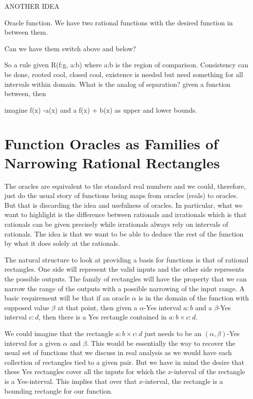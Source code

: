 \documentclass[12pt]{article}
\theoremstyle{remark}
\begin{document}
ANOTHER IDEA

Oracle function.  We have two rational functions with the desired function in between them. 

Can we have them switch above and below? 

So a rule given R(f:g, a:b) where a:b is the region of comparison. Consistency can be done, rooted cool, closed cool, existence is needed but need something for all intervals within domain. What is the analog of separation? given a function between, then

imagine f(x) -a(x) and a f(x) + b(x) as upper and lower bounds. 


\section{Function Oracles as Families of Narrowing Rational Rectangles}

The oracles are equivalent to the standard real numbers and we could, therefore, just do the usual story of functions being maps from oracles (reals) to oracles. But that is discarding the idea and usefulness of oracles. In particular, what we want to highlight is the difference between rationals and irrationals which is that rationals can be given precisely while irrationals always rely on intervals of rationals. The idea is that we want to be able to deduce the rest of the function by what it does solely at the rationals. 

The natural structure to look at providing a basis for functions is that of rational rectangles. One side will represent the valid inputs and the other side represents the possible outputs. The family of rectangles will have the property that we can narrow the range of the outputs with a possible narrowing of the input range. A basic requirement will be that if an oracle $\alpha$ is in the domain of the function with supposed value $\beta$ at that point, then given a $\alpha$-Yes interval $a:b$ and a $\beta$-Yes interval $c:d$, then there is a Yes rectangle contained in $a:b \times c:d$. 

We could imagine that the rectangle $a:b \times c:d$ just needs to be an $(\alpha, \beta)$-Yes interval for a given $\alpha$ and $\beta$. This would be essentially the way to recover the usual set of functions that we discuss in real analysis as we would have each collection of rectangles tied to a given pair. But we have in mind the desire that these Yes rectangles cover all the inputs for which the $x$-interval of the rectangle is a Yes-interval. This implies that over that $x$-interval, the rectangle is a bounding rectangle for our function. 
\end{document}
